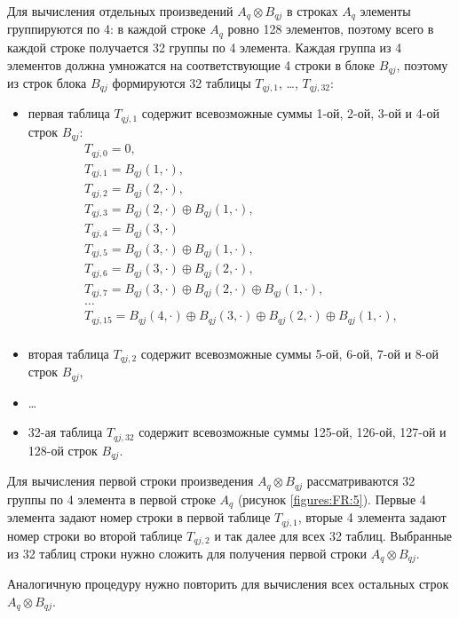 \documentclass[a4paper,12pt]{report}
\begin{document}
Для вычисления отдельных произведений $A_q \otimes B_{qj}$ в строках $A_q$ элементы группируются по 4: в каждой строке $A_q$ ровно 128 элементов, поэтому всего в каждой строке
получается 32 группы по 4 элемента. Каждая группа из 4 элементов должна умножатся на соответствующие 4 строки в блоке $B_{qj}$, поэтому из строк блока $B_{qj}$ формируются
32 таблицы $T_{qj,1}$, \ldots, $T_{qj,32}$:
\begin{itemize}
	\item первая таблица $T_{qj,1}$ содержит всевозможные суммы 1-ой, 2-ой, 3-ой и 4-ой строк $B_{qj}$:
		$$
			\begin{array}{l}
				T_{qj,0} = 0, \\
				T_{qj,1} = B_{qj}(1,\cdot), \\
				T_{qj,2} = B_{qj}(2,\cdot), \\
				T_{qj,3} = B_{qj}(2,\cdot) \oplus B_{qj}(1,\cdot), \\
				T_{qj,4} = B_{qj}(3,\cdot) \\
				T_{qj,5} = B_{qj}(3,\cdot) \oplus B_{qj}(1,\cdot), \\
				T_{qj,6} = B_{qj}(3,\cdot) \oplus B_{qj}(2,\cdot), \\
				T_{qj,7} = B_{qj}(3,\cdot) \oplus B_{qj}(2,\cdot) \oplus B_{qj}(1,\cdot), \\
				\ldots \\
				T_{qj,15} = B_{qj}(4,\cdot) \oplus B_{qj}(3,\cdot) \oplus B_{qj}(2,\cdot) \oplus B_{qj}(1,\cdot), \\
			\end{array}
		$$
	\item вторая таблица $T_{qj,2}$ содержит всевозможные суммы 5-ой, 6-ой, 7-ой и 8-ой строк $B_{qj}$,
	\item \ldots
	\item 32-ая таблица $T_{qj,32}$ содержит всевозможные суммы 125-ой, 126-ой, 127-ой и 128-ой строк $B_{qj}$.
\end{itemize}

Для вычисления первой строки произведения $A_q \otimes B_{qj}$ рассматриваются 32 группы по 4 элемента в первой строке $A_q$ (рисунок \ref{figures:FR:5}). Первые 4 элемента
задают номер строки в первой таблице $T_{qj,1}$, вторые 4 элемента задают номер строки во второй таблице $T_{qj,2}$ и так далее для всех 32 таблиц. Выбранные из 32 таблиц
строки нужно сложить для получения первой строки $A_q \otimes B_{qj}$.

Аналогичную процедуру нужно повторить для вычисления всех остальных строк $A_q \otimes B_{qj}$.
\end{document}
